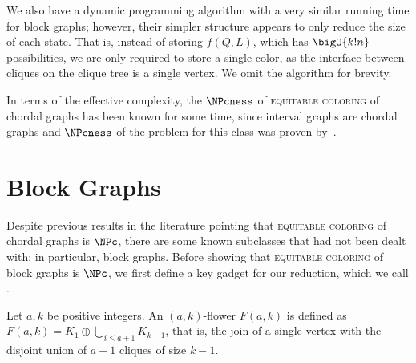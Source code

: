 We also have a dynamic programming algorithm with a very similar running time for block graphs; however, their simpler structure appears to only reduce the size of each state.
That is, instead of storing $f(Q, L)$, which has $\bigO{k!n}$ possibilities, we are only required to store a single color, as the interface between cliques on the clique tree is a single vertex.
We omit the algorithm for brevity.

In terms of the effective complexity, the $\NPcness$ of \textsc{equitable coloring} of chordal graphs has been known for some time, since interval graphs are chordal graphs and $\NPcness$ of the problem for this class was proven by~\citep{graph_partitioning1}.


\section{Block Graphs}
\label{sec:blocks}

Despite previous results in the literature pointing that \textsc{equitable coloring} of chordal graphs is $\NPc$, there are some known subclasses that had not been dealt with; in particular, block graphs.
Before showing that \textsc{equitable coloring} of block graphs is $\NPc$, we first define a key gadget for our reduction, which we call .

\begin{definition}[$(a,k)$-flower]
    Let $a,k$ be positive integers. An $(a,k)$-flower $F(a,k)$ is defined as $F(a,k) = K_1 \oplus \bigcup_{i \leq a+1} K_{k-1}$, that is, the join of a single vertex with the disjoint union of $a+1$ cliques of size $k-1$.
\end{definition}

